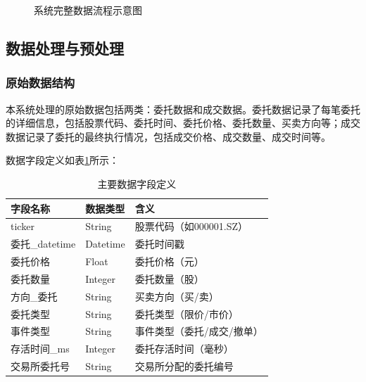 \documentclass[12pt,a4paper]{article}
\begin{document}
\begin{figure}[H]
\centering
{}
\caption{系统完整数据流程示意图}
\label{fig:system_flow}
\end{figure}

\subsection{数据处理与预处理}

\subsubsection{原始数据结构}

本系统处理的原始数据包括两类：委托数据和成交数据。委托数据记录了每笔委托的详细信息，包括股票代码、委托时间、委托价格、委托数量、买卖方向等；成交数据记录了委托的最终执行情况，包括成交价格、成交数量、成交时间等。

数据字段定义如表\ref{tab:data_fields}所示：

\begin{table}[H]
\centering
\caption{主要数据字段定义}
\label{tab:data_fields}
\begin{tabular}{lll}
\toprule
字段名称 & 数据类型 & 含义 \\
\midrule
ticker & String & 股票代码（如000001.SZ） \\
委托\_datetime & Datetime & 委托时间戳 \\
委托价格 & Float & 委托价格（元） \\
委托数量 & Integer & 委托数量（股） \\
方向\_委托 & String & 买卖方向（买/卖） \\
委托类型 & String & 委托类型（限价/市价） \\
事件类型 & String & 事件类型（委托/成交/撤单） \\
存活时间\_ms & Integer & 委托存活时间（毫秒） \\
交易所委托号 & String & 交易所分配的委托编号 \\
\bottomrule
\end{tabular}
\end{table}
\end{document}

